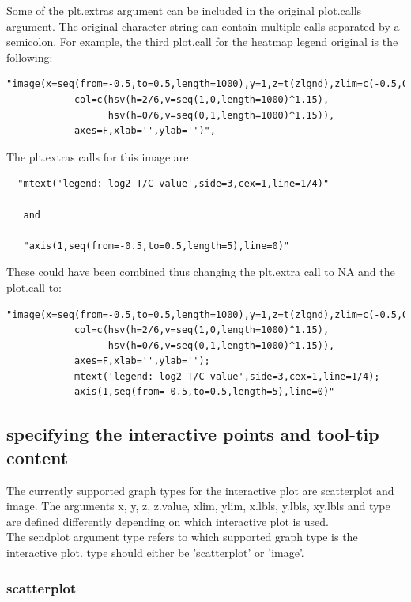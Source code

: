 \documentclass[]{article}
\begin{document}
 Some of the plt.extras argument can be included in the original plot.calls argument. The original character string can contain multiple calls separated by a semicolon. For example, the third plot.call for the heatmap legend original is the following:
  
\begin{verbatim}
"image(x=seq(from=-0.5,to=0.5,length=1000),y=1,z=t(zlgnd),zlim=c(-0.5,0.5),
            col=c(hsv(h=2/6,v=seq(1,0,length=1000)^1.15),
                  hsv(h=0/6,v=seq(0,1,length=1000)^1.15)),
            axes=F,xlab='',ylab='')",
\end{verbatim}

The plt.extras calls for this image are: 
\begin{verbatim}
  "mtext('legend: log2 T/C value',side=3,cex=1,line=1/4)"
  
   and 

   "axis(1,seq(from=-0.5,to=0.5,length=5),line=0)"
\end{verbatim}


\indent These could have been combined thus changing the plt.extra call to NA and the plot.call to:
\begin{verbatim}
"image(x=seq(from=-0.5,to=0.5,length=1000),y=1,z=t(zlgnd),zlim=c(-0.5,0.5),
            col=c(hsv(h=2/6,v=seq(1,0,length=1000)^1.15),
                  hsv(h=0/6,v=seq(0,1,length=1000)^1.15)),
            axes=F,xlab='',ylab=''); 
            mtext('legend: log2 T/C value',side=3,cex=1,line=1/4);
            axis(1,seq(from=-0.5,to=0.5,length=5),line=0)"
\end{verbatim}


\subsection{specifying the interactive points and tool-tip content}


\indent The currently supported graph types for the interactive plot are scatterplot and image. The arguments x, y, z, z.value, xlim, ylim, x.lbls, y.lbls, xy.lbls and type are defined differently depending on which interactive plot is used. \\
\indent The sendplot argument type refers to which supported graph type is the interactive plot. type should either be 'scatterplot' or 'image'.

\subsubsection{scatterplot}
\end{document}
